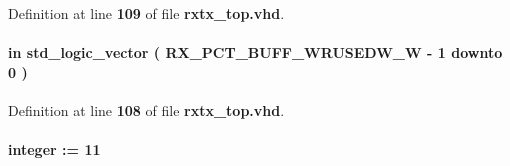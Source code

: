 Definition at line {\bf 109} of file {\bf rxtx\+\_\+top.\+vhd}.

\paragraph[{rx\+\_\+pct\+\_\+fifo\+\_\+wusedw}]{ {\bfseries \textcolor{keywordflow}{in}\textcolor{vhdlchar}{ }} {\bfseries \textcolor{comment}{std\+\_\+logic\+\_\+vector}\textcolor{vhdlchar}{ }\textcolor{vhdlchar}{(}\textcolor{vhdlchar}{ }\textcolor{vhdlchar}{ }\textcolor{vhdlchar}{ }\textcolor{vhdlchar}{ }{\bfseries {\bf R\+X\+\_\+\+P\+C\+T\+\_\+\+B\+U\+F\+F\+\_\+\+W\+R\+U\+S\+E\+D\+W\+\_\+W}} \textcolor{vhdlchar}{-\/}\textcolor{vhdlchar}{ } \textcolor{vhdldigit}{1} \textcolor{vhdlchar}{ }\textcolor{keywordflow}{downto}\textcolor{vhdlchar}{ }\textcolor{vhdlchar}{ } \textcolor{vhdldigit}{0} \textcolor{vhdlchar}{ }\textcolor{vhdlchar}{)}\textcolor{vhdlchar}{ }} \hspace{0.3cm}{\ttfamily [Port]}}\label{classrxtx__top_af5993e444283c9982e48d747c619552d}


Definition at line {\bf 108} of file {\bf rxtx\+\_\+top.\+vhd}.

\paragraph[{R\+X\+\_\+\+S\+M\+P\+L\+\_\+\+B\+U\+F\+F\+\_\+\+R\+D\+U\+S\+E\+D\+W\+\_\+W}]{ {\bfseries \textcolor{vhdlchar}{ }} {\bfseries \textcolor{comment}{integer}\textcolor{vhdlchar}{ }\textcolor{vhdlchar}{ }\textcolor{vhdlchar}{\+:}\textcolor{vhdlchar}{=}\textcolor{vhdlchar}{ }\textcolor{vhdlchar}{ } \textcolor{vhdldigit}{11} \textcolor{vhdlchar}{ }} \hspace{0.3cm}{\ttfamily [Generic]}}\label{classrxtx__top_a835943b9c585cee7e43a756c1ab62f09}



